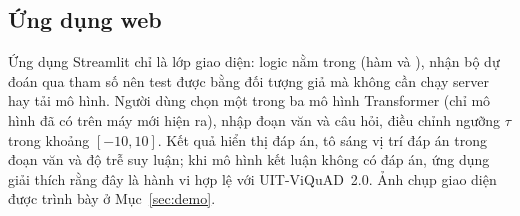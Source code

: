 \subsection{Ứng dụng web}
\label{sec:demo-design}

Ứng dụng Streamlit  chỉ là lớp giao diện: logic nằm trong
 (hàm  và ), nhận bộ dự đoán qua tham số nên
test được bằng đối tượng giả mà không cần chạy server hay tải mô hình. Người dùng chọn một
trong ba mô hình Transformer (chỉ mô hình đã có trên máy mới hiện ra), nhập đoạn văn và câu
hỏi, điều chỉnh ngưỡng $\tau$ trong khoảng $[-10, 10]$. Kết quả hiển thị đáp án, tô sáng vị
trí đáp án trong đoạn văn và độ trễ suy luận; khi mô hình kết luận không có đáp án, ứng dụng
giải thích rằng đây là hành vi hợp lệ với UIT-ViQuAD~2.0. Ảnh chụp giao diện được trình bày
ở Mục~\ref{sec:demo}.
